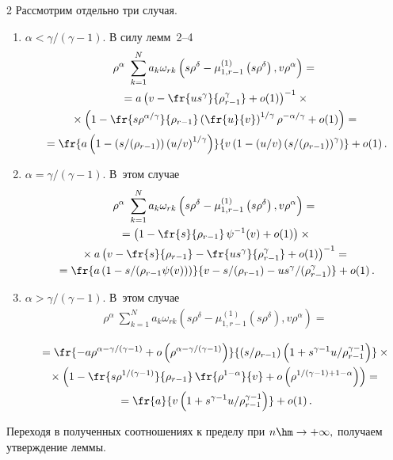 \begin{multicols}{2}
Рассмотрим отдельно три случая.
\begin{enumerate}[1.]
\item $\alpha<{\gamma}/({\gamma-1}).$ В силу лемм~2--4
\begin{multline*}
\rho^{\alpha}\ \sum\limits_{k=1}^N a_k\omega_{rk}\left(s\rho^{\delta}-\mu_{1,r-1}^{(1)}\left(
s\rho^{\delta}\right),v\rho^{\alpha}\right)={}\\
{}=a\left(v-\fr{us^{\gamma}}{\rho_{r-1}^{\gamma}}+
o(1)\right)^{-1}\times{}\\
{}\times
\left(1-\fr{s\rho^{{\alpha}/{\gamma}}}{\rho_{r-1}}\left(\fr{u}{v}\right)^{{1}/{\gamma}}
\rho^{-{\alpha}/{\gamma}}+o(1)\right)={}\\
{}=\fr{a\left(1-({s}/({\rho_{r-1}}))
\left({u}/{v}\right)^{{1}/{\gamma}}\right)}
{v\left(1-({u}/{v})\left({s}/({\rho_{r-1}})\right)^{\gamma}\right)}
+o(1)\,.
\end{multline*}

\item $\alpha={\gamma}/({\gamma-1}).$ В~этом случае
\begin{multline*}
\rho^{\alpha}\ \sum\limits_{k=1}^N a_k\omega_{rk}\left(s\rho^{\delta}-\mu_{1,r-1}^{(1)}
\left(s\rho^{\delta}\right),v\rho^{\alpha}\right)={}\\
{}=
\left(1-\fr{s}{\rho_{r-1}}\,\psi^{-1}(v)+o(1)\right)\times{}
\\
{}\times a\left(v-\fr{s}{\rho_{r-1}}-\fr{us^{\gamma}}{\rho_{r-1}^{\gamma}}+o(1)\right)^{-1}={}\\
{}=
\fr{a\left(1-{s}/({\rho_{r-1}\psi(v)})\right)}{v-{s}/({\rho_{r-1}})-
{us^{\gamma}}/({\rho_{r-1}^{\gamma}})}+o(1)\,.
\end{multline*}

\item $\alpha>{\gamma}/({\gamma-1}).$ В~этом случае
\begin{multline*}
\rho^{\alpha}\ \sum\limits_{k=1}^N a_k\omega_{rk}\left(s\rho^{\delta}-\mu_{1,r-1}^{(1)}\left(s
\rho^{\delta}\right),v\rho^{\alpha}\right)={}
\end{multline*}

\noindent
\begin{multline*}
{}=
\fr{-a\rho^{\alpha-{\gamma}/({\gamma-1})}+o\left(\rho^{\alpha-{\gamma}/({\gamma-1})}\right)}
{({s}/{\rho_{r-1}})
\left(1+{s^{\gamma-1}u}/{\rho_{r-1}^{\gamma-1}}\right)}
\times{}\\
{}\times\left(1-\fr{s\rho^{{1}/({\gamma-1})}}{\rho_{r-1}}\,\fr{\rho^{1-\alpha}}{v}+
o\left(\rho^{{1}/({\gamma-1})+1-\alpha}\right)\right)={}\\
{}=
\fr{a}{v\left(1+{s^{\gamma-1}u}/{\rho_{r-1}^{\gamma-1}}\right)}+o(1)\,.
\end{multline*}
\end{enumerate}
Переходя в полученных соотношениях к пределу при $n\hm\rightarrow+\infty,$ 
получаем утверждение леммы.


\end{multicols}

